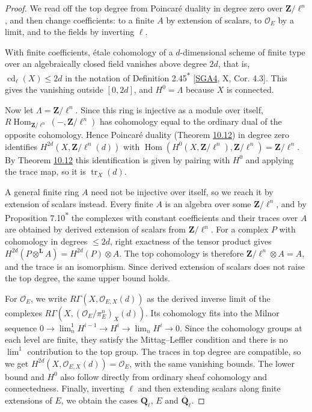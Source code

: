 \documentclass[11pt]{article}
\newcommand{\bpout}[1]{#1\textsuperscript{\hyperlink{bp-outside}{\ensuremath{\ast}}}}
\providecommand{\Hom}{}\renewcommand{\Hom}{\operatorname{Hom}}
\begin{document}
\begin{proof}[{Proof}]\label{bp47}%
We read off the top degree from Poincaré duality in degree zero over \(\mathbf Z/\ell^n\), and then change coefficients: to a finite \(A\) by extension of scalars, to \(\mathcal O_E\) by a limit, and to the fields by inverting \(\ell\).

With finite coefficients, étale cohomology of a \(d\)-dimensional scheme of finite type over an algebraically closed field vanishes above degree \(2d\), that is, \(\operatorname{cd}_\ell(X)\le2d\) in the notation of Definition \bpout{2.45} [\hyperref[bp70]{SGA4}, X, Cor. 4.3]. This gives the vanishing outside \([0,2d]\), and \(H^0=\Lambda\) because \(X\) is connected.

Now let \(\Lambda=\mathbf Z/\ell^n\). Since this ring is injective as a module over itself, \(R\!\operatorname{Hom}_{\mathbf Z/\ell^n}(-,\mathbf Z/\ell^n)\) has cohomology equal to the ordinary dual of the opposite cohomology. Hence Poincaré duality (Theorem \hyperref[bp37]{10.12}) in degree zero identifies \(H^{2d}(X,\mathbf Z/\ell^n(d))\) with \(\Hom(H^0(X,\mathbf Z/\ell^n),\mathbf Z/\ell^n)=\mathbf Z/\ell^n\). By Theorem \hyperref[bp37]{10.12} this identification is given by pairing with \(H^0\) and applying the trace map, so it is \(\operatorname{tr}_X(d)\).

A general finite ring \(A\) need not be injective over itself, so we reach it by extension of scalars instead. Every finite \(A\) is an algebra over some \(\mathbf Z/\ell^n\), and by Proposition \bpout{7.10} the complexes with constant coefficients and their traces over \(A\) are obtained by derived extension of scalars from \(\mathbf Z/\ell^n\). For a complex \(P\) with cohomology in degrees \(\le2d\), right exactness of the tensor product gives \(H^{2d}(P\otimes^{\mathbf L}A)=H^{2d}(P)\otimes A\). The top cohomology is therefore \(\mathbf Z/\ell^n\otimes A=A\), and the trace is an isomorphism. Since derived extension of scalars does not raise the top degree, the same upper bound holds.

For \(\mathcal O_E\), we write \(R\Gamma(X,\mathcal O_{E,X}(d))\) as the derived inverse limit of the complexes \(R\Gamma(X,(\mathcal O_E/\pi_E^n)_X(d))\). Its cohomology fits into the Milnor sequence \(0\to\lim^1_nH^{i-1}\to H^i\to\lim_nH^i\to0\). Since the cohomology groups at each level are finite, they satisfy the Mittag–Leffler condition and there is no \(\lim^1\) contribution to the top group. The traces in top degree are compatible, so we get \(H^{2d}(X,\mathcal O_{E,X}(d))=\mathcal O_E\), with the same vanishing bounds. The lower bound and \(H^0\) also follow directly from ordinary sheaf cohomology and connectedness. Finally, inverting \(\ell\) and then extending scalars along finite extensions of \(E\), we obtain the cases \(\mathbf Q_\ell\), \(E\) and \(\overline{\mathbf Q}_\ell\).
\end{proof}
\end{document}
